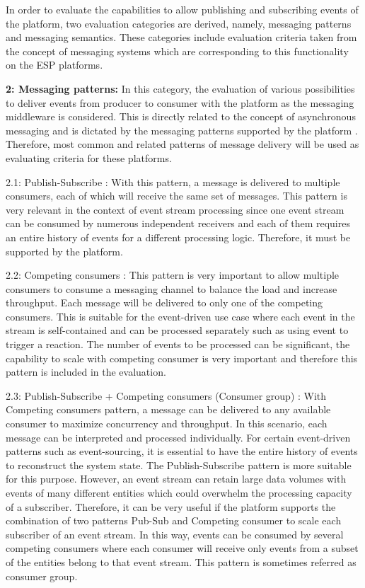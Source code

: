 In order to evaluate the capabilities to allow publishing and subscribing events of the platform, two evaluation categories are derived, namely, messaging patterns and messaging semantics. These categories include evaluation criteria taken from the concept of messaging systems which are corresponding to this functionality on the ESP platforms.

\textbf{2: Messaging patterns:} In this category, the evaluation of various possibilities to deliver events from producer to consumer with the platform as the messaging middleware is considered. This is directly related to the concept of asynchronous messaging and is dictated by the messaging patterns supported by the platform \cite{messaging}. Therefore, most common and related patterns of message delivery will be used as evaluating criteria for these platforms.

2.1: Publish-Subscribe \cite{messagingpubsub}: 
With this pattern, a message is delivered to multiple consumers, each of which will receive the same set of messages. This pattern is very relevant in the context of event stream processing since one event stream can be consumed by numerous independent receivers and each of them requires an entire history of events for a different processing logic. Therefore, it must be supported by the platform.

2.2: Competing consumers \cite{messagingcompetingconsumers}:
This pattern is very important to allow multiple consumers to consume a messaging channel to balance the load and increase throughput. Each message will be delivered to only one of the competing consumers. This is suitable for the event-driven use case where each event in the stream is self-contained and can be processed separately such as using event to trigger a reaction. The number of events to be processed can be significant, the capability to scale with competing consumer is very important and therefore this pattern is included in the evaluation.

2.3: Publish-Subscribe + Competing consumers (Consumer group) \cite{messagingcompetingconsumers}:
With Competing consumers pattern, a message can be delivered to any available consumer to maximize concurrency and throughput. In this scenario, each message can be interpreted and processed individually. For certain event-driven patterns such as event-sourcing, it is essential to have the entire history of events to reconstruct the system state. The Publish-Subscribe pattern is more suitable for this purpose. However, an event stream can retain large data volumes with events of many different entities which could overwhelm the processing capacity of a subscriber. Therefore, it can be very useful if the platform supports the combination of two patterns Pub-Sub and Competing consumer to scale each subscriber of an event stream. In this way, events can be consumed by several competing consumers where each consumer will receive only events from a subset of the entities belong to that event stream. This pattern is sometimes referred as consumer group.

